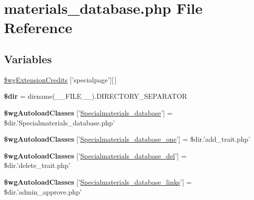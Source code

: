 \hypertarget{materials__database_8php}{\section{materials\+\_\+database.\+php File Reference}
\label{materials__database_8php}
}
\subsection*{Variables}
\begin{DoxyCompactItemize}
\item 
\hyperlink{materials__database_8php_a17b21c352c2b5481bd263dff39aba23e}{\$wg\+Extension\+Credits} \mbox{[}'specialpage'\mbox{]}\mbox{[}$\,$\mbox{]}
\item 
\hypertarget{materials__database_8php_a1659f0a629d408e0f849dbe4ee061e62}{{\bfseries \$dir} = dirname(\+\_\+\+\_\+\+F\+I\+L\+E\+\_\+\+\_\+).D\+I\+R\+E\+C\+T\+O\+R\+Y\+\_\+\+S\+E\+P\+A\+R\+A\+T\+O\+R}\label{materials__database_8php_a1659f0a629d408e0f849dbe4ee061e62}

\item 
\hypertarget{materials__database_8php_a8c6392f22558f2b653cf926134c5073a}{{\bfseries \$wg\+Autoload\+Classes} \mbox{[}'\hyperlink{classSpecialmaterials__database}{Specialmaterials\+\_\+database}'\mbox{]} = \$dir.'Specialmaterials\+\_\+database.\+php'}\label{materials__database_8php_a8c6392f22558f2b653cf926134c5073a}

\item 
\hypertarget{materials__database_8php_a598c23696420d815ab49c580fe399c77}{{\bfseries \$wg\+Autoload\+Classes} \mbox{[}'\hyperlink{classSpecialmaterials__database__one}{Specialmaterials\+\_\+database\+\_\+one}'\mbox{]} = \$dir.'add\+\_\+trait.\+php'}\label{materials__database_8php_a598c23696420d815ab49c580fe399c77}

\item 
\hypertarget{materials__database_8php_adc95a31beb3d9c96a57aed12bc997d16}{{\bfseries \$wg\+Autoload\+Classes} \mbox{[}'\hyperlink{classSpecialmaterials__database__del}{Specialmaterials\+\_\+database\+\_\+del}'\mbox{]} = \$dir.'delete\+\_\+trait.\+php'}\label{materials__database_8php_adc95a31beb3d9c96a57aed12bc997d16}

\item 
\hypertarget{materials__database_8php_ad56415069e5ee1cfeba87816a91128c5}{{\bfseries \$wg\+Autoload\+Classes} \mbox{[}'\hyperlink{classSpecialmaterials__database__links}{Specialmaterials\+\_\+database\+\_\+links}'\mbox{]} = \$dir.'admin\+\_\+approve.\+php'}\label{materials__database_8php_ad56415069e5ee1cfeba87816a91128c5}


\end{DoxyCompactItemize}
